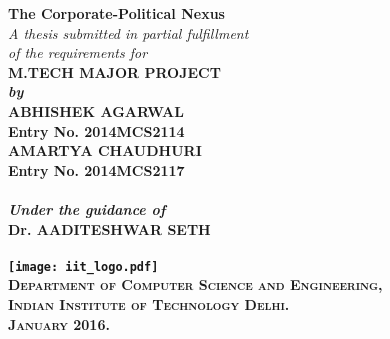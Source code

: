 \begin{titlepage}
\begin{center}

\LARGE{\textsf{\bfseries The Corporate-Political Nexus}}\\
\vspace{20pt}
\normalsize
\emph{A thesis submitted in partial fulfillment} \\
\emph{of the requirements for} \\
\vspace{20pt}
\bfseries M.TECH MAJOR PROJECT \\
\emph {by}\\
\vspace{20pt}
\Large{\textsf{\bfseries ABHISHEK AGARWAL}} \\
{\normalsize \textsf{\bfseries Entry No. 2014MCS2114}}\\
\vspace{10pt}
\Large{\textsf{\bfseries AMARTYA CHAUDHURI}} \\
{\normalsize \textsf{\bfseries Entry No. 2014MCS2117}}\\
\ \\
{\normalsize \emph {Under the guidance of}}
\ \\
\Large{\textsf{\bfseries Dr. AADITESHWAR SETH}} \\
\ \\
\vspace{30pt}
\texttt{[image: iit\_logo.pdf]} \\
\vspace{10pt}
\large{\textsc{Department of Computer Science and Engineering,\\
Indian Institute of Technology Delhi.\\ January 2016.}}
\end{center}
\end{titlepage}

